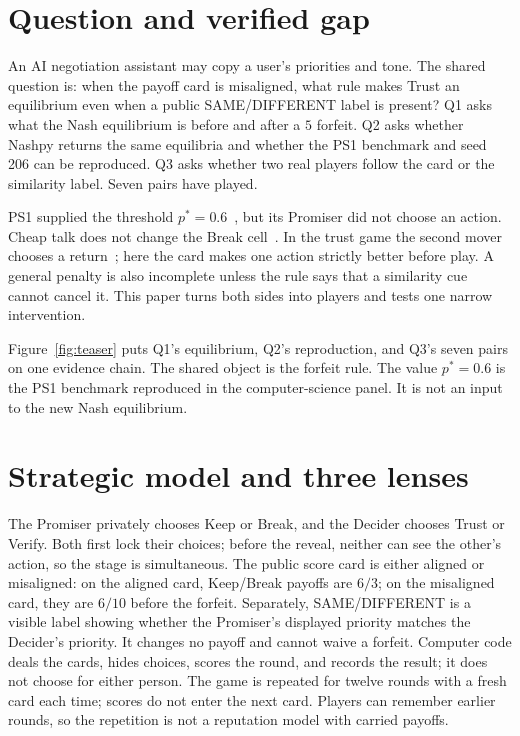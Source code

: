 \section{Question and verified gap}
An AI negotiation assistant may copy a user's priorities and tone. The shared question is: when the payoff card is misaligned, what rule makes Trust an equilibrium even when a public SAME/DIFFERENT label is present? Q1 asks what the Nash equilibrium is before and after a $5$ forfeit. Q2 asks whether Nashpy returns the same equilibria and whether the PS1 benchmark and seed 206 can be reproduced. Q3 asks whether two real players follow the card or the similarity label. Seven pairs have played.

PS1 supplied the threshold $p^\ast=0.6$~\cite{chen2026ps1}, but its Promiser did not choose an action. Cheap talk does not change the Break cell~\cite{crawford1982}. In the trust game the second mover chooses a return~\cite{berg1995}; here the card makes one action strictly better before play. A general penalty is also incomplete unless the rule says that a similarity cue cannot cancel it. This paper turns both sides into players and tests one narrow intervention.

Figure~\ref{fig:teaser} puts Q1's equilibrium, Q2's reproduction, and Q3's seven pairs on one evidence chain. The shared object is the forfeit rule. The value $p^\ast=0.6$ is the PS1 benchmark reproduced in the computer-science panel. It is not an input to the new Nash equilibrium.

\section{Strategic model and three lenses}
The Promiser privately chooses Keep or Break, and the Decider chooses Trust or Verify. Both first lock their choices; before the reveal, neither can see the other's action, so the stage is simultaneous. The public score card is either aligned or misaligned: on the aligned card, Keep/Break payoffs are $6/3$; on the misaligned card, they are $6/10$ before the forfeit. Separately, SAME/DIFFERENT is a visible label showing whether the Promiser's displayed priority matches the Decider's priority. It changes no payoff and cannot waive a forfeit. Computer code deals the cards, hides choices, scores the round, and records the result; it does not choose for either person. The game is repeated for twelve rounds with a fresh card each time; scores do not enter the next card. Players can remember earlier rounds, so the repetition is not a reputation model with carried payoffs.

